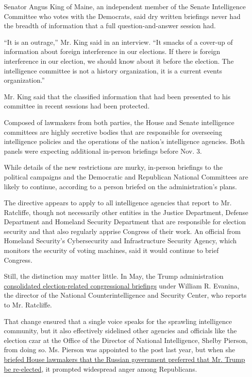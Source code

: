Senator Angus King of Maine, an independent member of the Senate
Intelligence Committee who votes with the Democrats, said dry written
briefings never had the breadth of information that a full
question-and-answer session had.

``It is an outrage,'' Mr. King said in an interview. ``It smacks of a
cover-up of information about foreign interference in our elections. If
there is foreign interference in our election, we should know about it
before the election. The intelligence committee is not a history
organization, it is a current events organization.''

Mr. King said that the classified information that had been presented to
his committee in recent sessions had been protected.

Composed of lawmakers from both parties, the House and Senate
intelligence committees are highly secretive bodies that are responsible
for overseeing intelligence policies and the operations of the nation's
intelligence agencies. Both panels were expecting additional in-person
briefings before Nov. 3.

While details of the new restrictions are murky, in-person briefings to
the political campaigns and the Democratic and Republican National
Committees are likely to continue, according to a person briefed on the
administration's plans.

The directive appears to apply to all intelligence agencies that report
to Mr. Ratcliffe, though not necessarily other entities in the Justice
Department, Defense Department and Homeland Security Department that are
responsible for election security and that also regularly apprise
Congress of their work. An official from Homeland Security's
Cybersecurity and Infrastructure Security Agency, which monitors the
security of voting machines, said it would continue to brief Congress.

Still, the distinction may matter little. In May, the Trump
administration
\href{https://www.nytimes3xbfgragh.onion/2020/05/15/us/politics/counterterrorism-intelligence.html}{consolidated
election-related congressional briefings} under William R. Evanina, the
director of the National Counterintelligence and Security Center, who
reports to Mr. Ratcliffe.

That change ensured that a single voice speaks for the sprawling
intelligence community, but it also effectively sidelined other agencies
and officials like the election czar at the Office of the Director of
National Intelligence, Shelby Pierson, from doing so. Ms. Pierson was
appointed to the post last year, but when she
\href{https://www.nytimes3xbfgragh.onion/2020/02/20/us/politics/russian-interference-trump-democrats.html}{briefed
House lawmakers that the Russian government preferred that Mr. Trump be
re-elected}, it prompted widespread anger among Republicans.

